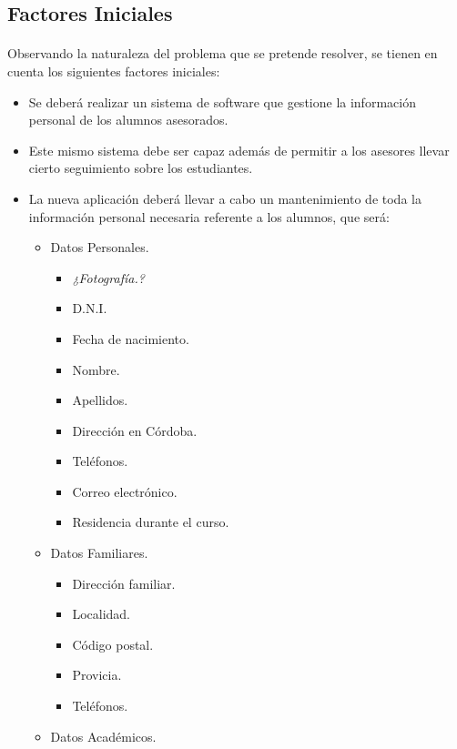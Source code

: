 \subsection{Factores Iniciales}

\paragraph{}Observando la naturaleza del problema que se pretende resolver, se
tienen en cuenta los siguientes factores iniciales:

\begin{itemize}
   \item Se deberá realizar un sistema de software que gestione la información
   personal de los alumnos asesorados.
   \item Este mismo sistema debe ser capaz además de permitir a los asesores
   llevar cierto seguimiento sobre los estudiantes.
   \item La nueva aplicación deberá llevar a cabo un mantenimiento de toda la
   información personal necesaria referente a los alumnos, que será:
   \begin{itemize}
      \item Datos Personales.
      \begin{itemize}
         \item \textit{¿Fotografía.?}
         \item D.N.I.
         \item Fecha de nacimiento.
         \item Nombre.
         \item Apellidos.
         \item Dirección en Córdoba.
         \item Teléfonos.
         \item Correo electrónico.
         \item Residencia durante el curso.
      \end{itemize}
      \item Datos Familiares.
      \begin{itemize}
         \item Dirección familiar.
         \item Localidad.
         \item Código postal.
         \item Provicia.
         \item Teléfonos.
      \end{itemize}
      \item Datos Académicos.

\end{itemize}
\end{itemize}

